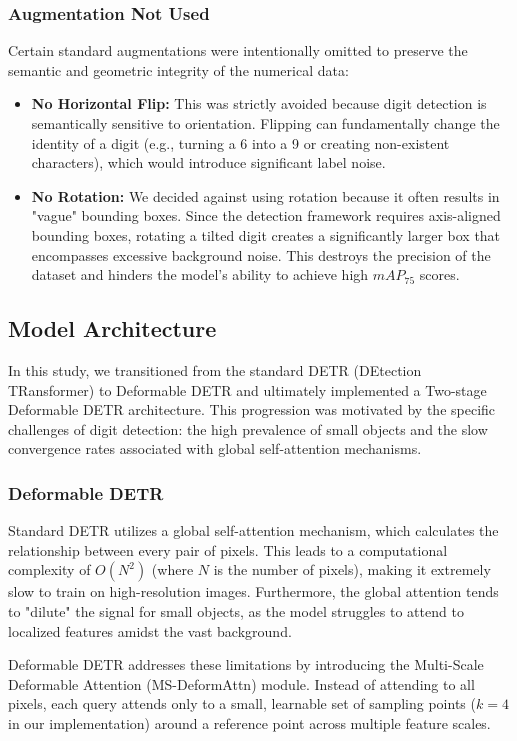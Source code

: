 \documentclass[a4paper]{article} %
\begin{document}
\subsubsection{Augmentation Not Used}
Certain standard augmentations were intentionally omitted to preserve the semantic and geometric integrity of the numerical data:
\begin{itemize}
    \item \textbf{No Horizontal Flip:} This was strictly avoided because digit detection is semantically sensitive to orientation. Flipping can fundamentally change the identity of a digit (e.g., turning a 6 into a 9 or creating non-existent characters), which would introduce significant label noise.
    \item \textbf{No Rotation:} We decided against using rotation because it often results in "vague" bounding boxes. Since the detection framework requires axis-aligned bounding boxes, rotating a tilted digit creates a significantly larger box that encompasses excessive background noise. This destroys the precision of the dataset and hinders the model's ability to achieve high $mAP_{75}$ scores.
\end{itemize}

\subsection{Model Architecture}

In this study, we transitioned from the standard DETR (DEtection TRansformer) to Deformable DETR and ultimately implemented a Two-stage Deformable DETR architecture. This progression was motivated by the specific challenges of digit detection: the high prevalence of small objects and the slow convergence rates associated with global self-attention mechanisms.

\subsubsection{Deformable DETR}
Standard DETR \cite{Standard_DETR_paper} utilizes a global self-attention mechanism, which calculates the relationship between every pair of pixels. This leads to a computational complexity of $O(N^2)$ (where $N$ is the number of pixels), making it extremely slow to train on high-resolution images. Furthermore, the global attention tends to "dilute" the signal for small objects, as the model struggles to attend to localized features amidst the vast background.

Deformable DETR \cite{deformable_DETR_paper, deformable_DETR_github} addresses these limitations by introducing the Multi-Scale Deformable Attention (MS-DeformAttn) module. Instead of attending to all pixels, each query attends only to a small, learnable set of sampling points ($k=4$ in our implementation) around a reference point across multiple feature scales.
\end{document}
